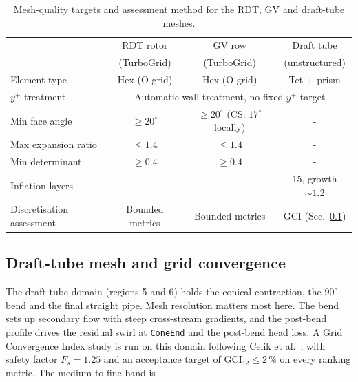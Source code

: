 \begin{table}[h!]
\centering
\caption[Mesh-quality summary]{Mesh-quality targets and assessment method for the RDT, GV and draft-tube meshes.}
\label{tab:mesh_quality}
\small
\begin{tabular}{l c c c}
\toprule
                            & RDT rotor       & GV row                                   & Draft tube \\
                            & (TurboGrid)     & (TurboGrid)                              & (unstructured) \\
\midrule
Element type                & Hex (O-grid)    & Hex (O-grid)                             & Tet + prism \\
$y^+$ treatment             & \multicolumn{3}{c}{Automatic wall treatment, no fixed $y^+$ target} \\
Min face angle              & $\geq 20^\circ$ & $\geq 20^\circ$ (CS: $17^\circ$ locally) & - \\
Max expansion ratio         & $\leq 1.4$     & $\leq 1.4$                               & - \\
Min determinant             & $\geq 0.4$     & $\geq 0.4$                               & - \\
Inflation layers            & -             & -                                      & 15, growth $\sim 1.2$ \\
Discretisation assessment   & Bounded metrics & Bounded metrics                          & GCI (Sec.~\ref{sec:gci_drafttube}) \\
\bottomrule
\end{tabular}
\end{table}

\subsection{Draft-tube mesh and grid convergence}
\label{sec:gci_drafttube}

The draft-tube domain (regions 5 and 6) holds the conical contraction, the $90^\circ$ bend and the final straight pipe. Mesh resolution matters most here. The bend sets up secondary flow with steep cross-stream gradients, and the post-bend profile drives the residual swirl at \texttt{ConeEnd} and the post-bend head loss. A Grid Convergence Index study is run on this domain following Celik et al.~\cite{Celik2008}, with safety factor $F_s = 1.25$ and an acceptance target of $\mathrm{GCI}_{12} \leq 2\,\%$ on every ranking metric. The medium-to-fine band is

